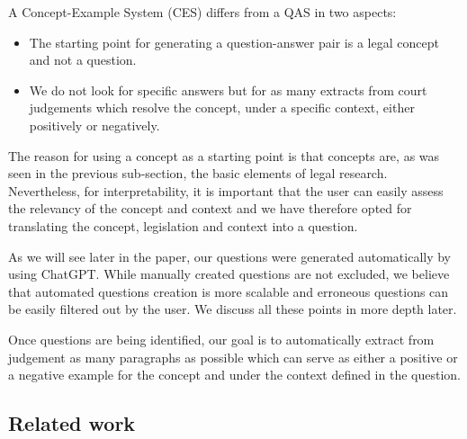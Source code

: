 A Concept-Example System (CES) differs from a QAS in two aspects:

\begin{itemize}
 \item The starting point for generating a question-answer pair is a legal concept and not a question.
 \item We do not look for specific answers but for as many extracts from court judgements which resolve the concept, under a specific context, either positively or negatively.
\end{itemize}

The reason for using a concept as a starting point is that concepts are, as was seen in the previous sub-section, the basic elements of legal research. Nevertheless, for interpretability, it is important that the user can easily assess the relevancy of the concept and context and we have therefore opted for translating the concept, legislation and context into a question.

As we will see later in the paper, our questions were generated automatically by using ChatGPT. While manually created questions are not excluded, we believe that automated questions creation is more scalable and erroneous questions can be easily filtered out by the user. We discuss all these points in more depth later.

Once questions are being identified, our goal is to automatically extract from judgement as many paragraphs as possible which can serve as either a positive or a negative example for the concept and under the context defined in the question.

\subsection{Related work}
\label{sec:sota}


